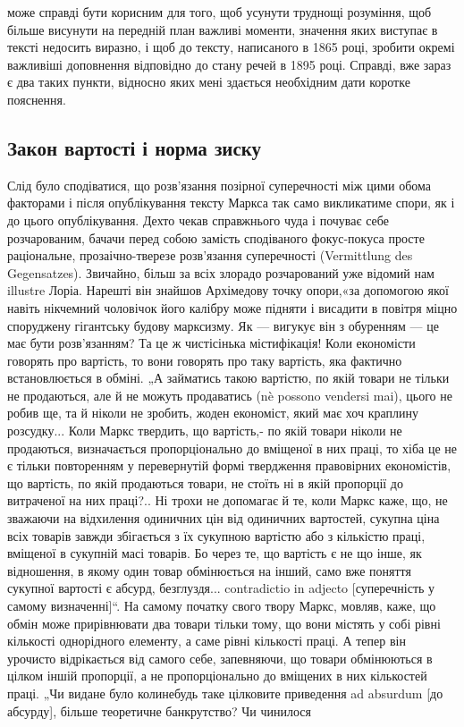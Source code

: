 \parcont{}  %
може справді бути корисним для того, щоб усунути труднощі розуміння, щоб більше висунути на
передній план важливі моменти, значення яких виступає в тексті недосить виразно, і щоб до
тексту, написаного в 1865 році, зробити окремі важливіші доповнення відповідно до стану речей в
1895 році. Справді, вже зараз є два таких пункти, відносно яких мені здається необхідним дати
коротке пояснення.

\subsection{Закон вартості і норма зиску}

Слід було сподіватися, що розв’язання позірної суперечності між цими обома факторами і після
опублікування тексту Маркса так само викликатиме спори, як і до цього опублікування. Дехто чекав
справжнього чуда і почуває себе розчарованим, бачачи перед собою замість сподіваного фокус-покуса
просте раціональне, прозаічно-тверезе розв’язання суперечності (Vermittlung
des Gegensatzes). Звичайно, більш за всіх злорадо розчарований уже відомий нам illustre Лоріа.
Нарешті він знайшов Архімедову точку опори,«за допомогою якої навіть нікчемний чоловічок його
калібру може підняти і висадити в повітря міцно споруджену гігантську будову марксизму. Як —
вигукує він з обуренням — це має бути розв’язанням? Та це ж чистісінька містифікація! Коли
економісти говорять про вартість, то вони говорять про таку вартість, яка фактично встановлюється
в обміні. „А займатись такою вартістю, по якій товари не тільки не продаються, але й не можуть
продаватись (nè possono vendersi mai), цього не робив ще, та й ніколи не зробить, жоден
економіст, який має хоч краплину розсудку... Коли Маркс твердить, що вартість,- по якій товари
ніколи не продаються, визначається пропорціонально до вміщеної в них праці, то хіба це не є тільки повторенням у
перевернутій формі твердження правовірних економістів, що вартість, по
якій продаються товари, не стоїть ні в якій пропорції до витраченої на них праці?..  Ні трохи не
допомагає й те, коли Маркс каже, що, не зважаючи
на відхилення одиничних цін від одиничних вартостей, сукупна ціна всіх товарів завжди збігається
з їх сукупною вартістю або з кількістю праці, вміщеної в сукупній масі товарів. Бо через те, що
вартість є не що інше, як відношення, в якому один товар обмінюється на інший, само вже поняття
сукупної вартості є абсурд, безглуздя... contradictio in adjecto [суперечність у самому визначенні]“. На самому
початку свого твору Маркс, мовляв, каже, що обмін може прирівнювати два товари
тільки тому, що вони містять у собі рівні кількості однорідного елементу, а саме рівні кількості
праці. А тепер він урочисто відрікається від самого себе, запевняючи, що товари обмінюються в
цілком іншій пропорції, а не
пропорціонально до вміщених в них кількостей праці. „Чи видане було колинебудь таке цілковите
приведення ad absurdum [до абсурду], більше теоретичне банкрутство? Чи чинилося
\parbreak{}  %
